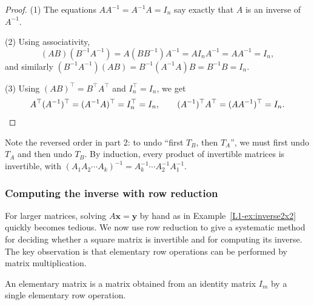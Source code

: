 \begin{proof}
    (1) The equations $A A^{-1} = A^{-1} A = I_n$ say exactly that $A$ is an inverse of $A^{-1}$.

    (2) Using associativity,
    \[(AB)(B^{-1}A^{-1}) = A(BB^{-1})A^{-1} = A I_n A^{-1} = AA^{-1} = I_n,\]
    and similarly $(B^{-1}A^{-1})(AB) = B^{-1}(A^{-1}A)B = B^{-1}B = I_n$.

    (3) Using $(AB)^\top = B^\top A^\top$ and $I_n^\top = I_n$, we get
    \[A^\top (A^{-1})^\top = (A^{-1}A)^\top = I_n^\top = I_n, \qquad (A^{-1})^\top A^\top = (AA^{-1})^\top = I_n. \qedhere\]
\end{proof}

Note the reversed order in part 2: to undo ``first $T_B$, then $T_A$'', we must first undo $T_A$ and then undo $T_B$. By induction, every product of invertible matrices is invertible, with $(A_1 A_2 \cdots A_k)^{-1} = A_k^{-1} \cdots A_2^{-1} A_1^{-1}$.

\subsubsection{Computing the inverse with row reduction}

For larger matrices, solving $A\mathbf{x} = \mathbf{y}$ by hand as in Example~\ref{L1-ex:inverse2x2} quickly becomes tedious. We now use row reduction to give a systematic method for deciding whether a square matrix is invertible and for computing its inverse. The key observation is that elementary row operations can be performed by matrix multiplication.

\begin{definition}
    An elementary matrix is a matrix obtained from an identity matrix $I_m$ by a single elementary row operation.
\end{definition}

